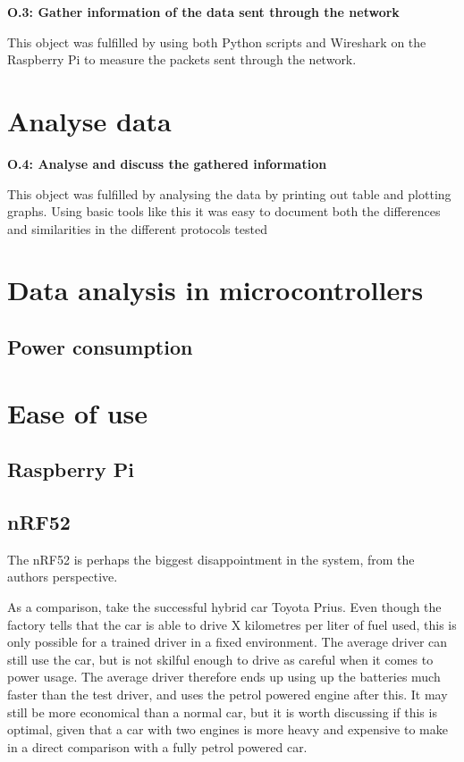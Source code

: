 \noindent\textbf{O.3: Gather information of the data sent through the network}

This object was fulfilled by using both Python scripts and Wireshark on the Raspberry Pi to measure the packets sent through the network. 

\section{Analyse data}

\noindent\textbf{O.4: Analyse and discuss the gathered information}

This object was fulfilled by analysing the data by printing out table and plotting graphs. Using basic tools like this it was easy to document both the differences and similarities in the different protocols tested 






\section{Data analysis in microcontrollers}



\subsection{Power consumption}



\section{Ease of use}


\subsection{Raspberry Pi}



\subsection{nRF52}

The nRF52 is perhaps the biggest disappointment in the system, from the authors perspective. 


As a comparison, take the successful hybrid car Toyota Prius. Even though the factory tells that the car is able to drive X kilometres per liter of fuel used, this is only possible for a trained driver in a fixed environment. The average driver can still use the car, but is not skilful enough to drive as careful when it comes to power usage. The average driver therefore ends up using up the batteries much faster than the test driver, and uses the petrol powered engine after this. It may still be more economical than a normal car, but it is worth discussing if this is optimal, given that a car with two engines is more heavy and expensive to make in a direct comparison with a fully petrol powered car. 


